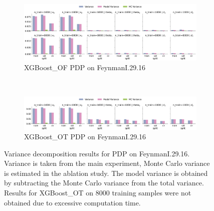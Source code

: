 \documentclass[runningheads]{llncs}
\begin{document}
\begin{figure}[ht!]
    \centering
    \begin{subfigure}[b]{0.9\textwidth}
        \includegraphics[width=\textwidth]{img/FeynmanI.29.16-all/variance_decomposition_pdp_XGBoost_OF.png}
        \caption{XGBoost\_OF PDP on FeynmanI.29.16}
    \end{subfigure}
    \\[10pt]
    \vfill
    \begin{subfigure}[b]{0.9\textwidth}
        \includegraphics[width=\textwidth]{img/FeynmanI.29.16-all/variance_decomposition_pdp_XGBoost_OT.png}
        \caption{XGBoost\_OT PDP on FeynmanI.29.16}
    \end{subfigure}
    \caption{Variance decomposition results for PDP on FeynmanI.29.16. Variance is taken from the
        main experiment, Monte Carlo variance is estimated in the ablation study. The model variance is
        obtained by subtracting the Monte Carlo variance from the total variance. Results for XGBoost\_OT
        on 8000 training samples were not obtained due to excessive computation time.}
    \label{fig:pdp-variance-decomp-feynman}  %
\end{figure}
\end{document}
